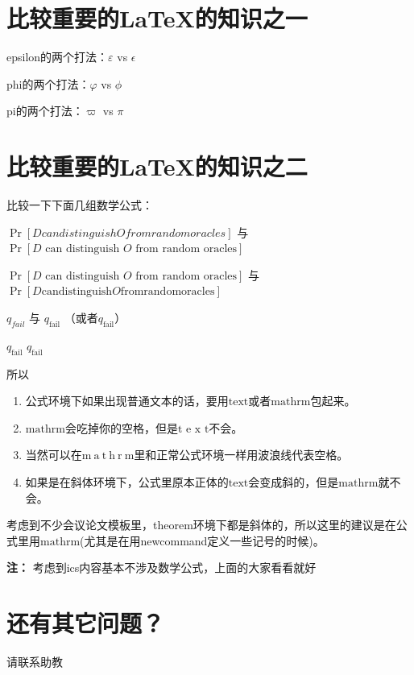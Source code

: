 \documentclass[twoside]{ctexart}
\begin{document}
    \section*{比较重要的\LaTeX 的知识之一}

    epsilon的两个打法：$\varepsilon$ vs $\epsilon$

    phi的两个打法：$\varphi$ vs $\phi$
    
    pi的两个打法：$\varpi$ vs $\pi$

    \section*{比较重要的\LaTeX 的知识之二}
    
    比较一下下面几组数学公式：
    
    $\Pr[D can distinguish O from random oracles]$ 与 $\Pr[D\text{ can distinguish }O\text{ from random oracles}]$

    $\Pr[D\text{ can distinguish }O\text{ from random oracles}]$ 与 $\Pr[D\mathrm{ can distinguish }O\mathrm{ from random oracles}]$

    $q_{fail}$ 与 $q_{\mathrm{fail}}$ （或者$q_{\text{fail}}$）

    \textit{$q_{\mathrm{fail}}$} \textit{$q_{\text{fail}}$}
    
    所以
    
    \begin{enumerate}
        \item 公式环境下如果出现普通文本的话，要用$\text{text}$或者$\mathrm{mathrm}$包起来。
        \item $\mathrm{m a t h r m}$会吃掉你的空格，但是$\text{t e x t}$不会。
        \item 当然可以在$\mathrm{m~a~t~h~r~m}$里和正常公式环境一样用波浪线代表空格。
        \item 如果是在斜体环境下，公式里原本正体的\textit{$\text{text}$}会变成斜的，但是\textit{$\mathrm{mathrm}$}就不会。
    \end{enumerate}
    
    考虑到不少会议论文模板里，theorem环境下都是斜体的，所以这里的建议是在公式里用$\mathrm{mathrm}$(尤其是在用newcommand定义一些记号的时候)。
    
    \textbf{注：} 考虑到ics内容基本不涉及数学公式，上面的大家看看就好
    
    
    \section{还有其它问题？}
    
    请联系助教
\end{document}
